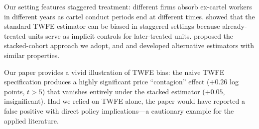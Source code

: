 Our setting features staggered treatment: different firms absorb ex-cartel workers in different years as cartel conduct periods end at different times. \citet{goodman2021difference} showed that the standard TWFE estimator can be biased in staggered settings because already-treated units serve as implicit controls for later-treated units. \citet{cengiz2019effect} proposed the stacked-cohort approach we adopt, and \citet{callaway2021difference} and \citet{borusyak2024revisiting} developed alternative estimators with similar properties.

Our paper provides a vivid illustration of TWFE bias: the naive TWFE specification produces a highly significant price ``contagion'' effect ($+0.26$ log points, $t > 5$) that vanishes entirely under the stacked estimator ($+0.05$, insignificant). Had we relied on TWFE alone, the paper would have reported a false positive with direct policy implications---a cautionary example for the applied literature.
